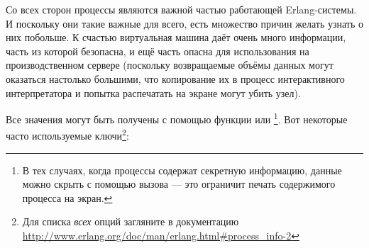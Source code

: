 \documentclass[11pt, oneside]{book}   	%
\begin{document}
Со всех сторон процессы являются важной частью работающей Erlang-системы. И поскольку они такие важные для всего, есть множество причин желать узнать о них побольше. К счастью виртуальная машина даёт очень много информации, часть из которой безопасна, и ещё часть опасна для использования на производственном сервере (поскольку возвращаемые объёмы данных могут оказаться настолько большими, что копирование их в процесс интерактивного интерпретатора и попытка распечатать на экране могут убить узел).

Все значения могут быть получены с помощью функции  или \footnote{В тех случаях, когда процессы содержат секретную информацию, данные можно скрыть с помощью вызова  --- это ограничит печать содержимого процесса на экран.}. Вот некоторые часто используемые ключи\footnote{Для списка \emph{всех} опций загляните в документацию \href{http://www.erlang.org/doc/man/erlang.html\#process\_info-2}{http://www.erlang.org/doc/man/erlang.html\#process\_info-2}}:
\end{document}
